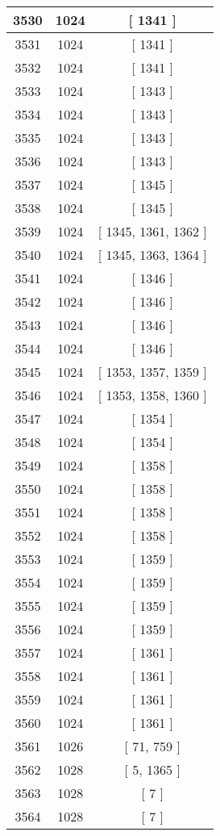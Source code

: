 \begin{center}
\begin{longtable}[H]{|| c c c ||}
\hline
3530 & 1024 & [ 1341 ] \\ 
\hline
3531 & 1024 & [ 1341 ] \\ 
\hline
3532 & 1024 & [ 1341 ] \\ 
\hline
3533 & 1024 & [ 1343 ] \\ 
\hline
3534 & 1024 & [ 1343 ] \\ 
\hline
3535 & 1024 & [ 1343 ] \\ 
\hline
3536 & 1024 & [ 1343 ] \\ 
\hline
3537 & 1024 & [ 1345 ] \\ 
\hline
3538 & 1024 & [ 1345 ] \\ 
\hline
3539 & 1024 & [ 1345, 1361, 1362 ] \\ 
\hline
3540 & 1024 & [ 1345, 1363, 1364 ] \\ 
\hline
3541 & 1024 & [ 1346 ] \\ 
\hline
3542 & 1024 & [ 1346 ] \\ 
\hline
3543 & 1024 & [ 1346 ] \\ 
\hline
3544 & 1024 & [ 1346 ] \\ 
\hline
3545 & 1024 & [ 1353, 1357, 1359 ] \\ 
\hline
3546 & 1024 & [ 1353, 1358, 1360 ] \\ 
\hline
3547 & 1024 & [ 1354 ] \\ 
\hline
3548 & 1024 & [ 1354 ] \\ 
\hline
3549 & 1024 & [ 1358 ] \\ 
\hline
3550 & 1024 & [ 1358 ] \\ 
\hline
3551 & 1024 & [ 1358 ] \\ 
\hline
3552 & 1024 & [ 1358 ] \\ 
\hline
3553 & 1024 & [ 1359 ] \\ 
\hline
3554 & 1024 & [ 1359 ] \\ 
\hline
3555 & 1024 & [ 1359 ] \\ 
\hline
3556 & 1024 & [ 1359 ] \\ 
\hline
3557 & 1024 & [ 1361 ] \\ 
\hline
3558 & 1024 & [ 1361 ] \\ 
\hline
3559 & 1024 & [ 1361 ] \\ 
\hline
3560 & 1024 & [ 1361 ] \\ 
\hline
3561 & 1026 & [ 71, 759 ] \\ 
\hline
3562 & 1028 & [ 5, 1365 ] \\ 
\hline
3563 & 1028 & [ 7 ] \\ 
\hline
3564 & 1028 & [ 7 ] \\ 

\end{longtable}
\end{center}
